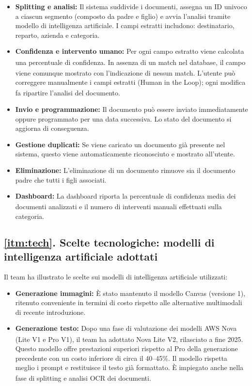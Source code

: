 \documentclass[a4paper,12pt]{article}
\newcommand{\G}{\textsubscript{\scalebox{0.6}{\textbf{G}}}\xspace}
\begin{document}
\begin{itemize}
    \item \textbf{Splitting e analisi:} Il sistema suddivide i documenti, assegna un ID
    univoco a ciascun segmento (composto da padre e figlio) e avvia l'analisi tramite
    modello di intelligenza artificiale. I campi estratti includono: destinatario, reparto,
    azienda e categoria.
    \item \textbf{Confidenza\G e intervento umano:} Per ogni campo estratto viene calcolata
    una percentuale di confidenza\G. In assenza di un match nel database\G, il campo viene
    comunque mostrato con l'indicazione di nessun match. L'utente può correggere manualmente
    i campi estratti (Human in the Loop\G); ogni modifica fa ripartire l'analisi del documento.
    \item \textbf{Invio e programmazione:} Il documento può essere inviato immediatamente
    oppure programmato per una data successiva. Lo stato del
    documento si aggiorna di conseguenza.
    \item \textbf{Gestione duplicati:} Se viene caricato un documento già presente nel sistema,
    questo viene automaticamente riconosciuto e mostrato all'utente.
    \item \textbf{Eliminazione:} L'eliminazione di un documento rimuove sia il documento padre
    che tutti i figli associati.
    \item \textbf{Dashboard:} La dashboard\G riporta la percentuale di confidenza\G media dei
    documenti analizzati e il numero di interventi manuali effettuati sulla categoria.
\end{itemize}

\subsection*{\ref{itm:tech}. Scelte tecnologiche: modelli di intelligenza artificiale adottati}

Il team ha illustrato le scelte sui modelli di intelligenza artificiale utilizzati:

\begin{itemize}
    \item \textbf{Generazione immagini:} È stato mantenuto il modello Canvas (versione 1),
    ritenuto conveniente in termini di costo rispetto alle alternative multimodali di recente
    introduzione.
    \item \textbf{Generazione testo:} Dopo una fase di valutazione dei modelli AWS\G Nova (Lite
    V1 e Pro V1), il team ha adottato Nova Lite V2, rilasciato a fine 2025. Questo modello
    offre prestazioni superiori rispetto al Pro della generazione precedente con un costo
    inferiore di circa il 40--45\%. Il modello rispetta meglio i prompt\G e restituisce il
    testo già formattato. È impiegato anche nella fase di splitting e analisi OCR\G dei documenti.
\end{itemize}
\end{document}
